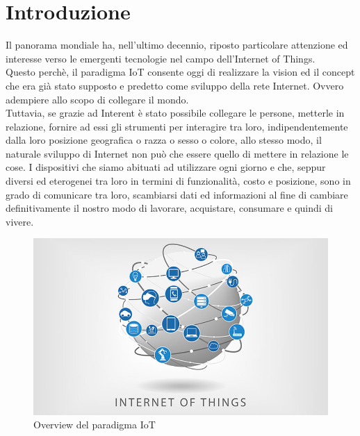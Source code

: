 \chapter{Introduzione}
\label{chap:introduzione}


%
%
%
%

Il panorama mondiale ha, nell'ultimo decennio, riposto particolare attenzione ed interesse verso le emergenti tecnologie nel campo dell'Internet of Things. \\ Questo perchè, il paradigma IoT consente oggi di realizzare la vision ed il concept che era già stato supposto e predetto come sviluppo della rete Internet. Ovvero adempiere allo scopo di collegare il mondo. \\
Tuttavia, se grazie ad Interent è stato possibile collegare le persone, metterle in relazione, fornire ad essi gli strumenti per interagire tra loro, indipendentemente dalla loro posizione geografica o razza o sesso o colore, allo stesso modo, il naturale sviluppo di Internet non può che essere quello di mettere in relazione le cose. I dispositivi che siamo abituati ad utilizzare ogni giorno e che, seppur diversi ed eterogenei tra loro in termini di funzionalità, costo e posizione, sono in grado di comunicare tra loro, scambiarsi dati ed informazioni al fine di cambiare definitivamente il nostro modo di lavorare, acquistare, consumare e quindi di vivere.
\begin{figure}
\begin{center}
\includegraphics[width=0.7\columnwidth]{images/iot.jpg}
\end{center}
\caption{Overview del paradigma IoT}
\label{fig:iot}
\end{figure}

